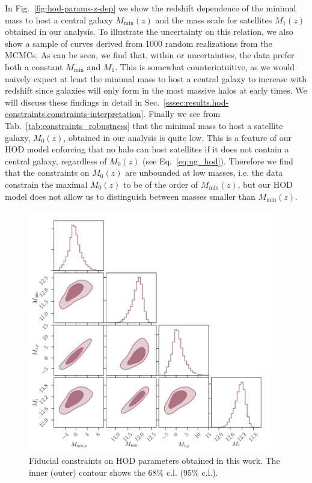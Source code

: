 \documentclass[a4paper,11pt]{article}
\begin{document}
In Fig.~\ref{fig:hod-params-z-dep} we show the redshift dependence of the minimal mass to host a central galaxy $M_{\mathrm{min}}(z)$ and the mass scale for satellites $M_{1}(z)$ obtained in our analysis. To illustrate the uncertainty on this relation, we also show a sample of curves derived from 1000 random realizations from the MCMCs. As can be seen, we find that, within or uncertainties, the data prefer both a constant $M_{\mathrm{min}}$ and $M_{1}$. This is somewhat counterintuitive, as we would naively expect at least the minimal mass to host a central galaxy to increase with redshift since galaxies will only form in the most massive halos at early times. We will discuss these findings in detail in Sec.~\ref{sssec:results.hod-constraints.constraints-interpretation}. Finally we see from Tab.~\ref{tab:constraints_robustness} that the minimal mass to host a satellite galaxy, $M_{0}(z)$, obtained in our analysis is quite low. This is a feature of our HOD model enforcing that no halo can host satellites if it does not contain a central galaxy, regardless of $M_{0}(z)$ (see Eq.~\ref{eq:ng_hod}). Therefore we find that the constraints on $M_{0}(z)$ are unbounded at low masses, i.e. the data constrain the maximal $M_{0}(z)$ to be of the order of $M_{\mathrm{min}}(z)$, but our HOD model does not allow us to distinguish between masses smaller than $M_{\mathrm{min}}(z)$.
  
\begin{figure}
\begin{center}
\includegraphics[width=0.95\textwidth]{figures/contours-Mmin-M1_mPk=HOD_fix=alpha-fc-sigmaM_HOD=zevol_fit=pz-shifts+prior=0p2-pz-widths+prior=0p2_fit=auto+cross_cosmo=const_cov=G+NG+SSC-LINBIAS_HOD-param=zfid_clfit=HOD-zevol.pdf}
\caption{Fiducial constraints on HOD parameters obtained in this work. The inner (outer) contour shows the $68 \%$ c.l. ($95 \%$ c.l.).}
\label{fig:constraints-fid-hod}
\end{center}
\end{figure}
\end{document}
